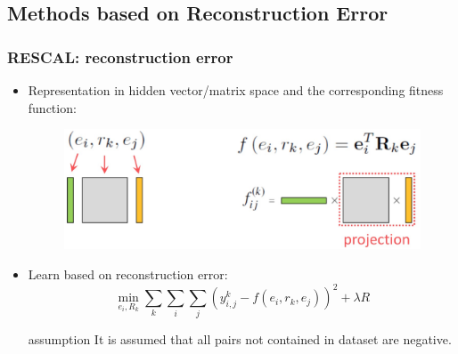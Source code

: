 \documentclass[pdf,10pt]{beamer}
\begin{document}
\subsection{Methods based on Reconstruction Error}
\begin{frame}
\frametitle{RESCAL: reconstruction error}
\begin{itemize}
	\item Representation in hidden vector/matrix space and the corresponding fitness function:
		\begin{figure}
			\includegraphics[height=0.20\textwidth]{5.eps}
		\end{figure}
	\item Learn based on reconstruction error:
		\begin{equation}
			\min_{e_i,R_k}\sum_k\sum_i\sum_j{(y_{i,j}^k-f(e_i,r_k,e_j))^2+\lambda R}
		\end{equation}
	\begin{exampleblock}{assumption}
		It is assumed that all pairs not contained in dataset are negative.
	\end{exampleblock}
\end{itemize}
\end{frame}
\end{document}
